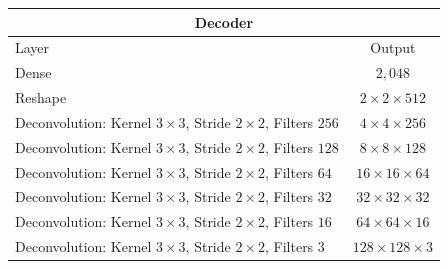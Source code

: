 \begin{center}
    \begin{table}[H]
        \centering
        \begin{tabular}{ | l | c | }
            \multicolumn{2}{c}{Decoder} \\ \hline
            Layer & Output\\ \hline
            Dense                                                                   & $2,048$                   \\
            Reshape                                                                 & $2\times 2\times    512$  \\
            Deconvolution: Kernel $3\times3$, Stride $2\times2$, Filters $256$      & $4\times 4\times    256$  \\  
            Deconvolution: Kernel $3\times3$, Stride $2\times2$, Filters $128$      & $8\times 8\times    128$  \\
            Deconvolution: Kernel $3\times3$, Stride $2\times2$, Filters $64 $      & $16\times 16\times  64 $  \\
            Deconvolution: Kernel $3\times3$, Stride $2\times2$, Filters $32 $      & $32\times 32\times  32 $  \\
            Deconvolution: Kernel $3\times3$, Stride $2\times2$, Filters $16 $      & $64\times 64\times  16 $  \\
            Deconvolution: Kernel $3\times3$, Stride $2\times2$, Filters $3  $      & $128\times 128\times3  $  \\
            \hline
        \end{tabular} 
    \end{table}
\end{center}

\vspace{-3em}

